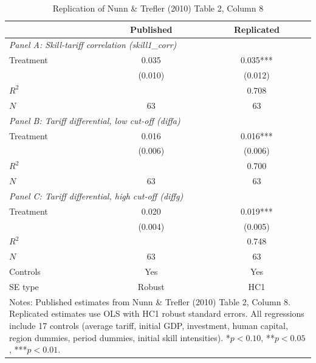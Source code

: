 \begin{table}[htbp]
\centering
\caption{Replication of Nunn \& Trefler (2010) Table 2, Column 8}
\label{tab:replication}
\begin{tabular}{lcc}
\hline\hline
 & Published & Replicated \\
\hline
\multicolumn{3}{l}{\textit{Panel A: Skill-tariff correlation (skill1\_corr)}} \\[3pt]
Treatment & 0.035 & 0.035*** \\
 & (0.010) & (0.012) \\
$R^2$ & & 0.708 \\
$N$ & 63 & 63 \\
\hline
\multicolumn{3}{l}{\textit{Panel B: Tariff differential, low cut-off (diffa)}} \\[3pt]
Treatment & 0.016 & 0.016*** \\
 & (0.006) & (0.006) \\
$R^2$ & & 0.700 \\
$N$ & 63 & 63 \\
\hline
\multicolumn{3}{l}{\textit{Panel C: Tariff differential, high cut-off (diffg)}} \\[3pt]
Treatment & 0.020 & 0.019*** \\
 & (0.004) & (0.005) \\
$R^2$ & & 0.748 \\
$N$ & 63 & 63 \\
\hline
Controls & Yes & Yes \\
SE type & Robust & HC1 \\
\hline\hline
\multicolumn{3}{p{0.7\textwidth}}{\footnotesize Notes: Published estimates from Nunn \& Trefler (2010) Table 2, Column 8. Replicated estimates use OLS with HC1 robust standard errors. All regressions include 17 controls (average tariff, initial GDP, investment, human capital, region dummies, period dummies, initial skill intensities). *$p<0.10$, **$p<0.05$, ***$p<0.01$.} \\
\end{tabular}
\end{table}